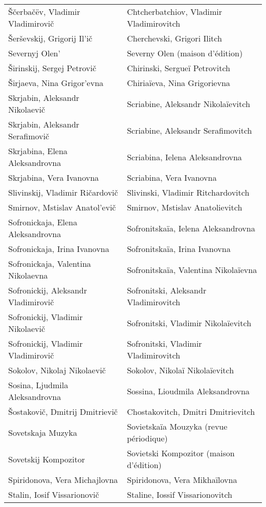 {\begin{longtable}[c]{ll}
 Ščerbačëv, Vladimir Vladimirovič
 & Chtcherbatchiov, Vladimir Vladimirovitch
 \\
 Šerševskij, Grigorij Il'ič
 & Cherchevski, Grigori Ilitch
 \\
 Severnyj Olen'
 & Severny Olen (maison d'édition)
 \\
 Širinskij, Sergej Petrovič
 & Chirinski, Sergueï Petrovitch
 \\
 Širjaeva, Nina Grigor'evna
 & Chiriaïeva, Nina Grigorievna
 \\
 Skrjabin, Aleksandr Nikolaevič
 & Scriabine, Aleksandr Nikolaïevitch
 \\
 Skrjabin, Aleksandr Serafimovič
 & Scriabine, Aleksandr Serafimovitch
 \\
 Skrjabina, Elena Aleksandrovna
 & Scriabina, Ielena Aleksandrovna
 \\
 Skrjabina, Vera Ivanovna
 & Scriabina, Vera Ivanovna
 \\
 Slivinskij, Vladimir Ričardovič
 & Slivinski, Vladimir Ritchardovitch
 \\
 Smirnov, Mstislav Anatol'evič
 & Smirnov, Mstislav Anatolievitch
 \\
 Sofronickaja, Elena Aleksandrovna
 & Sofronitskaïa, Ielena Aleksandrovna
 \\
 Sofronickaja, Irina Ivanovna
 & Sofronitskaïa, Irina Ivanovna
 \\
 Sofronickaja, Valentina Nikolaevna
 & Sofronitskaïa, Valentina Nikolaïevna
 \\
 Sofronickij, Aleksandr Vladimirovič
 & Sofronitski, Aleksandr Vladimirovitch
 \\
 Sofronickij, Vladimir Nikolaevič
 & Sofronitski, Vladimir Nikolaïevitch
 \\
 Sofronickij, Vladimir Vladimirovič
 & Sofronitski, Vladimir Vladimirovitch
 \\
 Sokolov, Nikolaj Nikolaevič
 & Sokolov, Nikolaï Nikolaïevitch
 \\
 Sosina, Ljudmila Aleksandrovna
 & Sossina, Lioudmila Aleksandrovna
 \\
 Šostakovič, Dmitrij Dmitrievič
 & Chostakovitch, Dmitri Dmitrievitch
 \\
 Sovetskaja Muzyka
 & Sovietskaïa Mouzyka (revue périodique)
 \\
 Sovetskij Kompozitor
 & Sovietski Kompozitor (maison d'édition)
 \\
 Spiridonova, Vera Michajlovna
 & Spiridonova, Vera Mikhaïlovna
 \\
 Stalin, Iosif Vissarionovič
 & Staline, Iossif Vissarionovitch

\end{longtable}}
